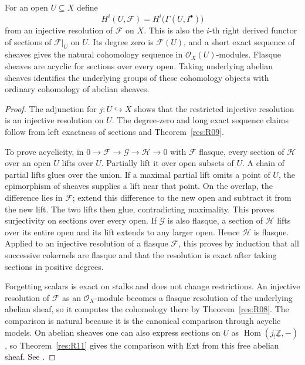 \begin{theorem}
\label{res:H01}
For an open \(U\subseteq X\) define
\[
  H^i(U,\mathcal F)=H^i\bigl(\Gamma(U,I^\bullet)\bigr)
\]
from an injective resolution of \(\mathcal F\) on \(X\). This is also
the \(i\)-th right derived functor of sections of \(\mathcal F|_U\)
on \(U\). Its degree zero is \(\mathcal F(U)\), and a short exact
sequence of sheaves gives the natural cohomology sequence in
\(\mathcal O_X(U)\)-modules. Flasque sheaves are acyclic for sections
over every open. Taking underlying abelian sheaves identifies the
underlying groups of these cohomology objects with ordinary
cohomology of abelian sheaves.
\end{theorem}
\begin{proof}
The adjunction for \(j:U\hookrightarrow X\) shows that the restricted
injective resolution is an injective resolution on \(U\).
The degree-zero and long exact sequence claims follow from left
exactness of sections and Theorem~\ref{res:R09}.

To prove acyclicity, in \(0\to\mathcal F\to\mathcal G\to\mathcal H\to0\)
with \(\mathcal F\) flasque, every section of \(\mathcal H\) over an open
\(U\) lifts over \(U\). Partially lift it over open subsets of \(U\).
A chain of partial lifts glues over the union. If a maximal partial
lift omits a point of \(U\), the epimorphism of sheaves supplies a lift
near that point. On the overlap, the difference lies in \(\mathcal F\);
extend this difference to the new open and subtract it from the new lift.
The two lifts then glue, contradicting maximality. This proves
surjectivity on sections over every open. If \(\mathcal G\) is also
flasque, a section of \(\mathcal H\) lifts over its entire open
and its lift extends to any larger open. Hence \(\mathcal H\) is flasque.
Applied to an injective resolution of a flasque \(\mathcal F\), this
proves by induction that all successive cokernels are flasque and that
the resolution is exact after taking sections in positive degrees.

Forgetting scalars is exact on stalks and does not change restrictions.
An injective resolution of \(\mathcal F\) as an \(\mathcal O_X\)-module
becomes a flasque resolution of the underlying abelian sheaf, so it
computes the cohomology there by Theorem~\ref{res:R08}. The comparison
is natural because it is the canonical comparison through acyclic
models. On abelian sheaves one can also express sections on \(U\) as
\(\operatorname{Hom}(j_!\underline{\mathbb Z},-)\), so
Theorem~\ref{res:R11} gives the comparison with Ext from this free
abelian sheaf. See \cite[Tags 0712, 01E1, 01E3, 09SY]{stacks-sheaf}.
\end{proof}

